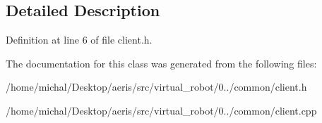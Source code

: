 \subsection{Detailed Description}


Definition at line 6 of file client.\-h.



The documentation for this class was generated from the following files\-:\begin{DoxyCompactItemize}
\item 
/home/michal/\-Desktop/aeris/src/virtual\-\_\-robot/0../common/client.\-h\item 
/home/michal/\-Desktop/aeris/src/virtual\-\_\-robot/0../common/client.\-cpp\end{DoxyCompactItemize}
